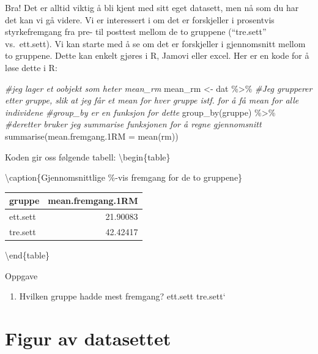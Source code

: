 \documentclass[
]{book}
\newenvironment{Shaded}{\begin{snugshade}}{\end{snugshade}}
\newcommand{\AttributeTok}[1]{\textcolor[rgb]{0.77,0.63,0.00}{#1}}
\newcommand{\CommentTok}[1]{\textcolor[rgb]{0.56,0.35,0.01}{\textit{#1}}}
\newcommand{\FunctionTok}[1]{\textcolor[rgb]{0.00,0.00,0.00}{#1}}
\newcommand{\NormalTok}[1]{#1}
\newcommand{\OtherTok}[1]{\textcolor[rgb]{0.56,0.35,0.01}{#1}}
\newcommand{\SpecialCharTok}[1]{\textcolor[rgb]{0.00,0.00,0.00}{#1}}
\providecommand{\tightlist}{%
  \setlength{\itemsep}{0pt}\setlength{\parskip}{0pt}}
\begin{document}
Bra! Det er alltid viktig å bli kjent med sitt eget datasett, men nå som du har det kan vi gå videre. Vi er interessert i om det er forskjeller i prosentvis styrkefremgang fra pre- til posttest mellom de to gruppene (``tre.sett'' vs.~ett.sett). Vi kan starte med å se om det er forskjeller i gjennomsnitt mellom to gruppene. Dette kan enkelt gjøres i R, Jamovi eller excel. Her er en kode for å løse dette i R:

\begin{Shaded}
\begin{Highlighting}[]
\CommentTok{\#jeg lager et oobjekt som heter mean\_rm }
\NormalTok{mean\_rm }\OtherTok{\textless{}{-}}\NormalTok{ dat }\SpecialCharTok{\%\textgreater{}\%}
  \CommentTok{\#Jeg grupperer etter gruppe, slik at jeg får et mean for hver gruppe istf. for å få mean for alle individene}
  \CommentTok{\#group\_by er en funksjon for dette}
  \FunctionTok{group\_by}\NormalTok{(gruppe) }\SpecialCharTok{\%\textgreater{}\%}
  \CommentTok{\#deretter bruker jeg summarise funksjonen for å regne gjennomsnitt}
  \FunctionTok{summarise}\NormalTok{(}\AttributeTok{mean.fremgang.1RM =} \FunctionTok{mean}\NormalTok{(rm))}
\end{Highlighting}
\end{Shaded}

Koden gir oss følgende tabell:
\textbackslash begin\{table\}

\textbackslash caption\{\label{tab:unnamed-chunk-6}Gjennomsnittlige \%-vis fremgang for de to gruppene\}
\centering

\begin{tabular}[t]{lr}
\toprule
gruppe & mean.fremgang.1RM\\
\midrule
ett.sett & 21.90083\\
tre.sett & 42.42417\\
\bottomrule
\end{tabular}

\textbackslash end\{table\}

{Oppgave}

\begin{enumerate}
\def\labelenumi{\alph{enumi})}
\setcounter{enumi}{3}
\tightlist
\item
  Hvilken gruppe hadde mest fremgang?
  ett.sett tre.sett`
\end{enumerate}

\hypertarget{figur-av-datasettet}{%
\section{Figur av datasettet}\label{figur-av-datasettet}}
\end{document}
